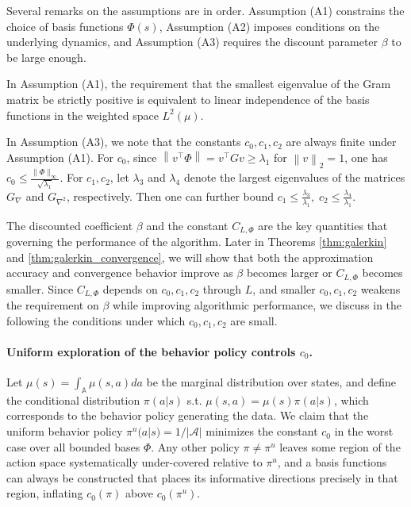 \documentclass[12pt]{article}
\def\lam{\lambda}
\def\A{{\mathbb A}}
\def\ll{\left\lVert}
\def\rl{\right\rVert}
\begin{document}
Several remarks on the assumptions are in order. Assumption (A1) constrains the choice of basis functions $\Phi(s)$, Assumption (A2) imposes conditions on the underlying dynamics, and Assumption (A3) requires the discount parameter $\beta$ to be large enough.

In Assumption (A1), the requirement that the smallest eigenvalue of the Gram matrix be strictly positive is equivalent to linear independence of the basis functions in the weighted space $L^2(\mu)$. 


In Assumption (A3), we note that the constants $c_0, c_1, c_2$ are always finite under Assumption (A1). For $c_0$, since $\ll v^\top \Phi \rl = v^\top G v \geq \lam_1$ for $\ll v \rl_2 = 1$, one has $c_0 \le \frac{\|\Phi\|_\infty}{\sqrt{\lambda_1}}.$ For $c_1, c_2$,  let $\lambda_3$ and $\lambda_4$ denote the largest eigenvalues of the matrices $G_{\nabla}$ and $G_{\nabla^2}$, respectively. Then one can further bound $c_1 \leq \frac{\lambda_3}{\lambda_1}, \; c_2 \leq \frac{\lambda_4}{\lambda_1}$.


The discounted coefficient $\beta$ and the constant $C_{L,\Phi}$ are the key quantities that governing the performance of the algorithm. Later in Theorems \ref{thm:galerkin} and \ref{thm:galerkin_convergence},  we will show that both the approximation accuracy and convergence behavior improve as $\beta$ becomes larger or $C_{L,\Phi}$ becomes smaller. Since $C_{L,\Phi}$ depends on $c_0, c_1, c_2$
through $L$, and smaller $c_0, c_1, c_2$ weakens the requirement on $\beta$
while improving algorithmic performance, we discuss in the following the
conditions under which $c_0, c_1, c_2$ are small.


\paragraph{Uniform exploration of the behavior policy controls $c_0$.} Let $\mu(s) = \int_\A \mu(s,a) da$ be the marginal distribution over states, and define the conditional
distribution $\pi(a|s)$ s.t. $\mu(s,a) = \mu(s)\pi(a|s)$, which corresponds to the behavior policy generating the data. We claim that the uniform behavior policy $\pi^u(a|s) = 1/|\mathcal{A}|$ minimizes the constant $c_0$ in the worst case over all
bounded bases $\Phi$.
Any other policy $\pi \neq \pi^u$ leaves some region of the action space
systematically under-covered relative to $\pi^u$, and a basis functions can
always be constructed that places its informative directions precisely in
that region, inflating $c_0(\pi)$ above $c_0(\pi^u)$.
\end{document}
